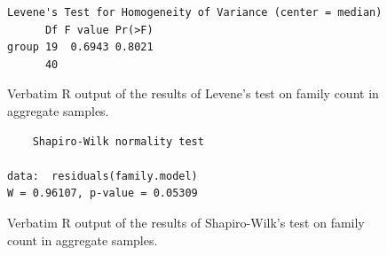 \documentclass[10pt,letterpaper,twocolumn]{article}
\begin{document}
\begin{figure}[h]
	\lstset{numbers=left}
	\lstset{xleftmargin=5mm,framexleftmargin=5mm}
	\begin{lstlisting}
Levene's Test for Homogeneity of Variance (center = median)
      Df F value Pr(>F)
group 19  0.6943 0.8021
      40               
	\end{lstlisting}
	\caption{Verbatim R output of the results of Levene's test on family count in aggregate samples.}
	\label{fig:bulk_family_levene}
	\smallskip
	\nointerlineskip
	\hrulefill
\end{figure}

\begin{figure}[h]
	\lstset{numbers=left}
	\lstset{xleftmargin=5mm,framexleftmargin=5mm}
	\begin{lstlisting}
	Shapiro-Wilk normality test

data:  residuals(family.model)
W = 0.96107, p-value = 0.05309
	\end{lstlisting}
	\caption{Verbatim R output of the results of Shapiro-Wilk's test on family count in aggregate samples.}
	\label{fig:bulk_family_shapiro}
	\smallskip
	\nointerlineskip
	\hrulefill
\end{figure}
\end{document}
